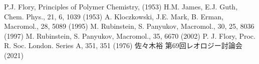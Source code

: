 \begin{columns}[totalwidth=.85\linewidth]
    \column{\textwidth}
    \vspace{-10mm}
        \beamertemplatetextbibitems
        \small
        \begin{thebibliography}{99}
             P.J. Flory, Principles of Polymer Chemistry, (1953)
             H.M. James, E.J. Guth, Chem. Phys., 21, 6, 1039 (1953)
             A. Kloczkowski, J.E. Mark, B. Erman, Macromol., 28, 5089 (1995)
             M. Rubinstein, S. Panyukov, Macromol., 30, 25, 8036 (1997)
             M. Rubinstein, S. Panyukov, Macromol., 35, 6670 (2002)
             P. J. Flory, Proc. R. Soc. London. Series A, 351, 351 (1976)
             佐々木裕 第69回レオロジー討論会 (2021)
        \end{thebibliography}
    \end{columns}